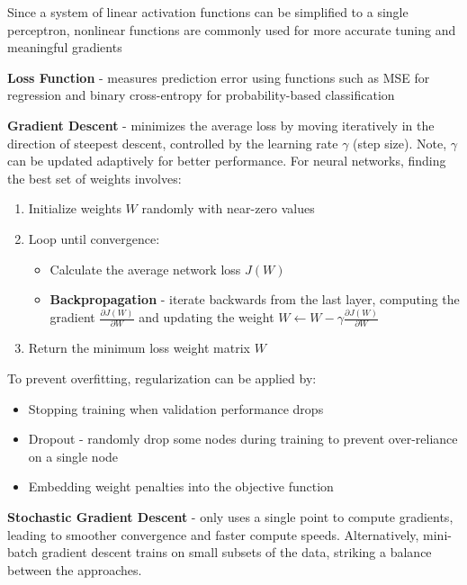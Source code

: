\documentclass[10pt,landscape]{article}
\begin{document}
\begin{multicols}{3}
\begin{center}
\begin{tabular}{c|c|c}
\end{tabular}
\end{center}
Since a system of linear activation functions can be simplified to a single perceptron, nonlinear functions are commonly used for more accurate tuning and meaningful gradients

\smallskip
\textbf{Loss Function} - measures prediction error using functions such as MSE for regression and binary cross-entropy for probability-based classification

\smallskip
\textbf{Gradient Descent} - minimizes the average loss by moving iteratively in the direction of steepest descent, controlled by the learning rate $\gamma$ (step size). Note, $\gamma$ can be updated adaptively for better performance. For neural networks, finding the best set of weights involves: 
\begin{enumerate}[leftmargin=5mm]
\itemsep -.4mm 
\item Initialize weights $W$ randomly with near-zero values
\item Loop until convergence:
    \begin{itemize}[label={--},leftmargin=4mm]
    \itemsep -.4mm 
    \item Calculate the average network loss $J(W)$ 
    \item \textbf{Backpropagation} - iterate backwards from the last layer, computing the gradient $\frac{\partial J(W)}{\partial W}$ and updating the weight $W \leftarrow W - \gamma \frac{\partial J(W)}{\partial W}$
    \end{itemize}
\item Return the minimum loss weight matrix $W$ 
\end{enumerate}

To prevent overfitting, regularization can be applied by: 
\begin{itemize}[label={--},leftmargin=4mm]
\itemsep -.4mm 
\item Stopping training when validation performance drops
\item Dropout - randomly drop some nodes during training to prevent over-reliance on a single node
\item Embedding weight penalties into the objective function
\end{itemize}
\textbf{Stochastic Gradient Descent} - only uses a single point to compute gradients, leading to smoother convergence and faster compute speeds. Alternatively, mini-batch gradient descent trains on small subsets of the data, striking a balance between the approaches.


\end{multicols}
\end{document}
